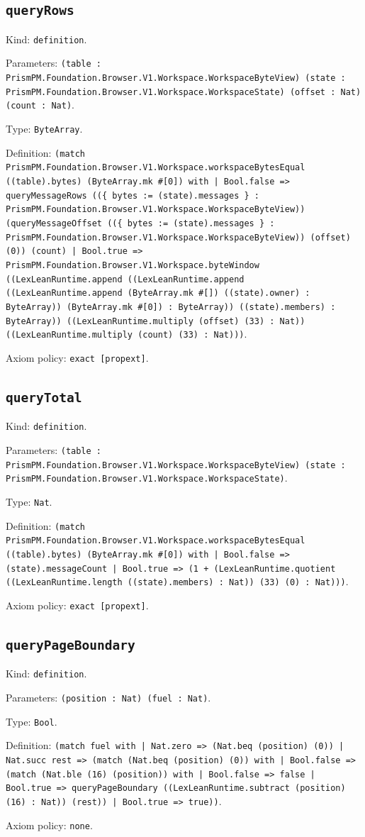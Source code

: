 \documentclass[11pt]{article}
\begin{document}
\subsection*{\texttt{queryRows}}
\noindent Kind: \texttt{definition}.\par
\noindent Parameters: \texttt{(table : PrismPM.Foundation.Browser.V1.Workspace.WorkspaceByteView) (state : PrismPM.Foundation.Browser.V1.Workspace.WorkspaceState) (offset : Nat) (count : Nat)}.\par
\noindent Type: \texttt{ByteArray}.\par
\noindent Definition: \texttt{(match PrismPM.Foundation.Browser.V1.Workspace.workspaceBytesEqual ((table).bytes) (ByteArray.mk \#[0]) with | Bool.false => queryMessageRows ((\{ bytes := (state).messages \} : PrismPM.Foundation.Browser.V1.Workspace.WorkspaceByteView)) (queryMessageOffset ((\{ bytes := (state).messages \} : PrismPM.Foundation.Browser.V1.Workspace.WorkspaceByteView)) (offset) (0)) (count) | Bool.true => PrismPM.Foundation.Browser.V1.Workspace.byteWindow ((LexLeanRuntime.append ((LexLeanRuntime.append ((LexLeanRuntime.append (ByteArray.mk \#[]) ((state).owner) : ByteArray)) (ByteArray.mk \#[0]) : ByteArray)) ((state).members) : ByteArray)) ((LexLeanRuntime.multiply (offset) (33) : Nat)) ((LexLeanRuntime.multiply (count) (33) : Nat)))}.\par
\noindent Axiom policy: \texttt{exact [propext]}.\par
\subsection*{\texttt{queryTotal}}
\noindent Kind: \texttt{definition}.\par
\noindent Parameters: \texttt{(table : PrismPM.Foundation.Browser.V1.Workspace.WorkspaceByteView) (state : PrismPM.Foundation.Browser.V1.Workspace.WorkspaceState)}.\par
\noindent Type: \texttt{Nat}.\par
\noindent Definition: \texttt{(match PrismPM.Foundation.Browser.V1.Workspace.workspaceBytesEqual ((table).bytes) (ByteArray.mk \#[0]) with | Bool.false => (state).messageCount | Bool.true => (1 + (LexLeanRuntime.quotient ((LexLeanRuntime.length ((state).members) : Nat)) (33) (0) : Nat)))}.\par
\noindent Axiom policy: \texttt{exact [propext]}.\par
\subsection*{\texttt{queryPageBoundary}}
\noindent Kind: \texttt{definition}.\par
\noindent Parameters: \texttt{(position : Nat) (fuel : Nat)}.\par
\noindent Type: \texttt{Bool}.\par
\noindent Definition: \texttt{(match fuel with | Nat.zero => (Nat.beq (position) (0)) | Nat.succ rest => (match (Nat.beq (position) (0)) with | Bool.false => (match (Nat.ble (16) (position)) with | Bool.false => false | Bool.true => queryPageBoundary ((LexLeanRuntime.subtract (position) (16) : Nat)) (rest)) | Bool.true => true))}.\par
\noindent Axiom policy: \texttt{none}.\par
\end{document}
